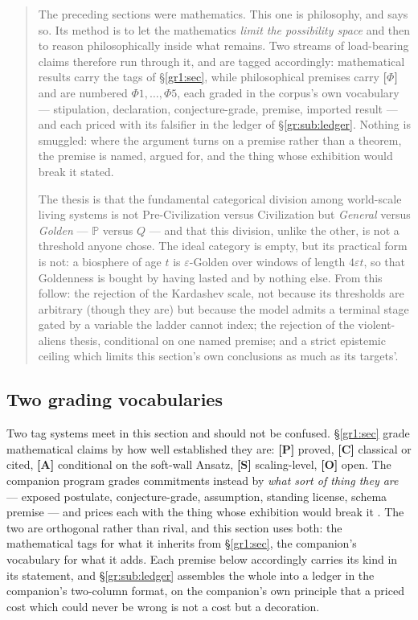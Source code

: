 \documentclass[11pt]{article}
\numberwithin{equation}{section}
\theoremstyle{plain}
\theoremstyle{definition}
\theoremstyle{remark}
\newcommand{\PP}{\mathbb{P}}
\begin{document}
\begin{quote}\small
The preceding sections were mathematics. This one is philosophy, and
says so. Its method is to let the mathematics \emph{limit the
possibility space} and then to reason philosophically inside what
remains. Two streams of load-bearing claims therefore run through it,
and are tagged accordingly: mathematical results carry the tags of
\S\ref{gr1:sec}, while philosophical premises carry \textbf{[$\Phi$]} and
are numbered $\Phi1,\dots,\Phi5$, each graded in the corpus's own
vocabulary --- stipulation, declaration, conjecture-grade, premise,
imported result --- and each priced with its falsifier in the ledger of
\S\ref{gr:sub:ledger}. Nothing is smuggled: where the argument turns on
a premise rather than a theorem, the premise is named, argued for, and
the thing whose exhibition would break it stated.

The thesis is that the fundamental categorical division among
world-scale living systems is not Pre-Civilization versus Civilization
but \emph{General} versus \emph{Golden} --- $\PP$ versus $Q$ --- and
that this division, unlike the other, is not a threshold anyone chose.
The ideal category is empty, but its practical form is not: a biosphere
of age $t$ is $\varepsilon$-Golden over windows of length $4\varepsilon
t$, so that Goldenness is bought by having lasted and by nothing else.
From this follow: the rejection of the Kardashev scale, not because its
thresholds are arbitrary (though they are) but because the model admits
a terminal stage gated by a variable the ladder cannot index; the rejection of the
violent-aliens thesis, conditional on one named premise; and a strict
epistemic ceiling which limits this section's own conclusions as much as
its targets'.
\end{quote}

\subsection*{Two grading vocabularies}
\label{gr:sub:grades}

Two tag systems meet in this section and should not be confused.
\S\ref{gr1:sec} grade mathematical claims by how well established they
are: \textbf{[P]} proved, \textbf{[C]} classical or cited, \textbf{[A]}
conditional on the soft-wall Ansatz, \textbf{[S]} scaling-level,
\textbf{[O]} open. The companion program grades commitments instead by
\emph{what sort of thing they are} --- exposed postulate,
conjecture-grade, assumption, standing license, schema premise --- and
prices each with the thing whose exhibition would break it
\cite{Nexus, Ben26Found, Ben26Optimal}. The two are orthogonal
rather than rival, and this section uses both: the mathematical tags for
what it inherits from \S\ref{gr1:sec}, the companion's vocabulary for what
it adds. Each premise below accordingly carries its kind in its
statement, and \S\ref{gr:sub:ledger} assembles the whole into a ledger
in the companion's two-column format, on the companion's own principle
that a priced cost which could never be wrong is not a cost but a
decoration.
\end{document}
